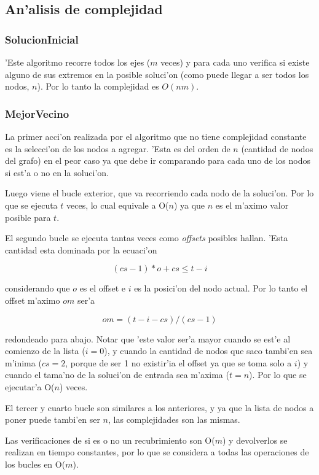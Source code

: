\subsection{An'alisis de complejidad}
\subsubsection{SolucionInicial}
'Este algoritmo recorre todos los ejes ($m$ veces) y para cada uno verifica si existe alguno de sus extremos en la posible soluci'on (como puede llegar a ser todos los nodos, $n$). Por lo tanto la complejidad es $O(nm)$. 

\subsubsection{MejorVecino}
La primer acci'on realizada por el algoritmo que no tiene complejidad constante es la selecci'on de los nodos a agregar. 'Esta es del orden de $n$ (cantidad de nodos del grafo) en el peor caso ya que debe ir comparando para cada uno de los nodos si est'a o no en la soluci'on.

Luego viene el bucle exterior, que va recorriendo cada nodo de la soluci'on. Por lo que se ejecuta $t$ veces, lo cual equivale a O($n$) ya que $n$ es el m'aximo valor posible para $t$.

El segundo bucle se ejecuta tantas veces como \emph{offsets} posibles hallan. 'Esta cantidad esta dominada por la ecuaci'on

$$(cs - 1) * o + cs \leq t - i$$

considerando que $o$ es el offset e $i$ es la posici'on del nodo actual. Por lo tanto el offset m'aximo $om$ ser'a

$$om = (t - i - cs) / (cs - 1)$$

redondeado para abajo. Notar que 'este valor ser'a mayor cuando se est'e al comienzo de la lista ($i=0$),  y cuando la cantidad de nodos que saco tambi'en sea m'inima ($cs=2$, porque de ser 1 no existir'ia el offset ya que se toma solo a $i$) y cuando el tama'no de la soluci'on de entrada sea m'axima ($t=n$). Por lo que se ejecutar'a O($n$) veces.

El tercer y cuarto bucle son similares a los anteriores, y ya que la lista de nodos a poner puede tambi'en ser $n$, las complejidades son las mismas.

Las verificaciones de si es o no un recubrimiento son O($m$) y devolverlos se realizan en tiempo constantes, por lo que se considera a todas las operaciones de los bucles en O($m$).

